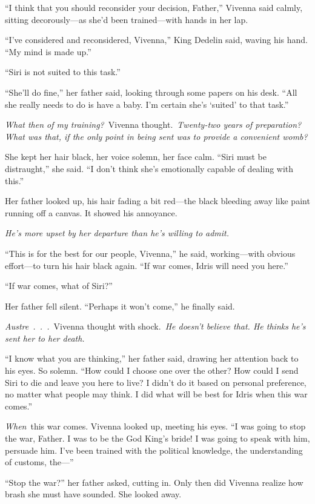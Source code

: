 \orn

“I think that you should reconsider your decision, Father,” Vivenna said calmly, sitting decorously—as she’d been trained—with hands in her lap.

“I’ve considered and reconsidered, Vivenna,” King Dedelin said, waving his hand. “My mind is made up.”

“Siri is not suited to this task.”

“She’ll do fine,” her father said, looking through some papers on his desk. “All she really needs to do is have a baby. I’m certain she’s ‘suited’ to that task.”

\textit{What then of my training?}~Vivenna thought.~\textit{Twenty-two years of preparation? What was that, if the only point in being sent was to provide a convenient womb?}

She kept her hair black, her voice solemn, her face calm. “Siri must be distraught,” she said. “I don’t think she’s emotionally capable of dealing with this.”

Her father looked up, his hair fading a bit red—the black bleeding away like paint running off a canvas. It showed his annoyance.

\textit{He’s more upset by her departure than he’s willing to admit.}

“This is for the best for our people, Vivenna,” he said, working—with obvious effort—to turn his hair black again. “If war comes, Idris will need you here.”

“If war comes, what of Siri?”

Her father fell silent. “Perhaps it won’t come,” he finally said.

\textit{Austre~.~.~.}~Vivenna thought with shock.~\textit{He doesn’t believe that. He thinks he’s sent her to her death.}

“I know what you are thinking,” her father said, drawing her attention back to his eyes. So solemn. “How could I choose one over the other? How could I send Siri to die and leave you here to live? I didn’t do it based on personal preference, no matter what people may think. I did what will be best for Idris when this war comes.”

\textit{When}~this war comes. Vivenna looked up, meeting his eyes. “I was going to stop the war, Father. I was to be the God King’s bride! I was going to speak with him, persuade him. I’ve been trained with the political knowledge, the understanding of customs, the—”

“Stop the war?” her father asked, cutting in. Only then did Vivenna realize how brash she must have sounded. She looked away.

